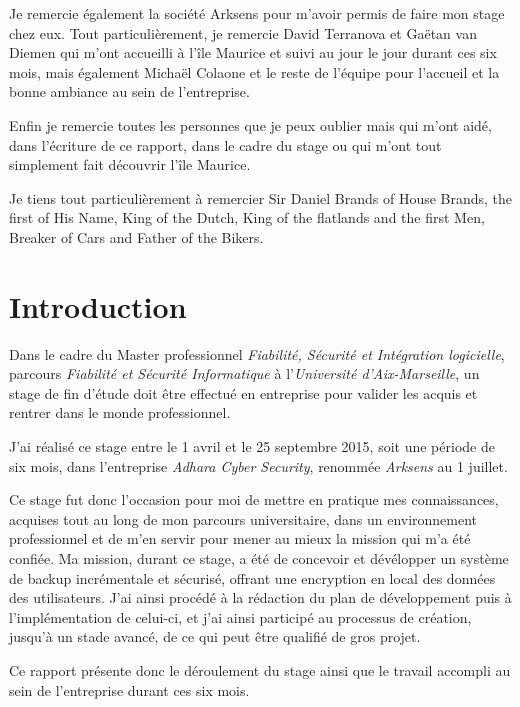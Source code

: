 \documentclass[a4paper,10pt, twoside]{report}
\begin{document}
\begin{spacing}{1.2}
Je remercie \'egalement la soci\'et\'e Arksens pour m'avoir permis de faire mon
stage chez eux. Tout particuli\`erement, je remercie David Terranova et Ga\"etan
van Diemen qui m'ont accueilli \`a l'\^ile Maurice et suivi au jour le jour
durant ces six mois, mais \'egalement Micha\"el Colaone et le reste de
l'\'equipe pour l'accueil et la bonne ambiance au sein de l'entreprise.

Enfin je remercie toutes les personnes que je peux oublier mais qui m'ont
aid\'e, dans l'\'ecriture de ce rapport, dans le cadre du stage ou qui m'ont
tout simplement fait d\'ecouvrir l'\^ile Maurice.

Je tiens tout particuli\`erement \`a remercier Sir Daniel Brands of House Brands,
the first of His Name, King of the Dutch, King of the flatlands and the first
Men, Breaker of Cars and Father of the Bikers.

\tableofcontents
\thispagestyle{plain}

\chapter*{Introduction}
\thispagestyle{fancy}
Dans le cadre du Master professionnel \textit{Fiabilit\'e, S\'ecurit\'e et
Int\'egration logicielle}, parcours \textit{Fiabilit\'e et S\'ecurit\'e
Informatique} \`a l'\textit{Universit\'e d'Aix-Marseille}, un stage de fin
d'\'etude doit \^etre effectu\'e en entreprise pour valider les acquis et
rentrer dans le monde professionnel.

J'ai r\'ealis\'e ce stage entre le 1 avril et le 25 septembre 2015, soit
une p\'eriode de six mois, dans l'entreprise \textit{Adhara Cyber Security},
renomm\'ee \textit{Arksens} au 1 juillet.

Ce stage fut donc l'occasion pour moi de mettre en pratique mes connaissances,
acquises tout au long de mon parcours universitaire, dans un environnement
professionnel et de m'en servir pour mener au mieux la mission qui m'a
\'et\'e confi\'ee. Ma mission, durant ce stage, a \'et\'e de concevoir et
d\'ev\'elopper un syst\`eme de backup incr\'ementale et s\'ecuris\'e, offrant
une encryption en local des donn\'ees des utilisateurs. J'ai ainsi proc\'ed\'e
\`a la r\'edaction du plan de d\'eveloppement puis \`a l'impl\'ementation de
celui-ci, et j'ai ainsi particip\'e au processus de cr\'eation, jusqu'\`a un
stade avanc\'e, de ce qui peut \^etre qualifi\'e de gros projet.

Ce rapport pr\'esente donc le d\'eroulement du stage ainsi que le travail
accompli au sein de l'entreprise durant ces six mois.



\end{spacing}
\end{document}
